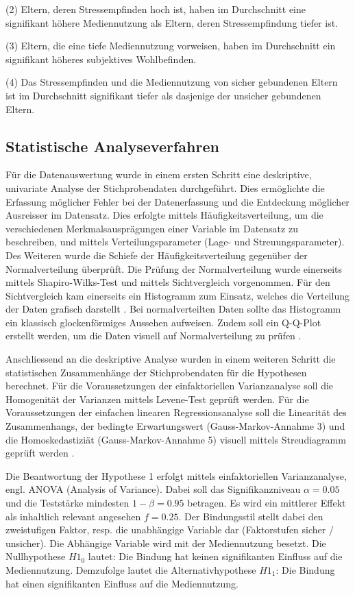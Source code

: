 (2) Eltern, deren Stressempfinden hoch ist, haben im Durchschnitt eine signifikant höhere Mediennutzung als Eltern, deren Stressempfindung tiefer ist.

(3) Eltern, die eine tiefe Mediennutzung vorweisen, haben im Durchschnitt ein signifikant höheres subjektives Wohlbefinden.

(4) Das Stressempfinden und die Mediennutzung von sicher gebundenen Eltern ist im Durchschnitt signifikant tiefer als dasjenige der unsicher gebundenen Eltern.


\subsection{Statistische Analyseverfahren}
Für die Datenauswertung wurde in einem ersten Schritt eine deskriptive, univariate Analyse der Stichprobendaten durchgeführt. Dies ermöglichte die Erfassung möglicher Fehler bei der Datenerfassung und die Entdeckung möglicher Ausreisser im Datensatz. Dies erfolgte mittels Häufigkeitsverteilung, um die verschiedenen Merkmalsausprägungen einer Variable im Datensatz zu beschreiben, und mittels Verteilungsparameter (Lage- und Streuungsparameter). Des Weiteren wurde die Schiefe der Häufigkeitsverteilung gegenüber der Normalverteilung überprüft. Die Prüfung der Normalverteilung wurde einerseits mittels Shapiro-Wilks-Test \cite{Shapiro1965} und mittels Sichtvergleich vorgenommen. Für den Sichtvergleich kam einerseits ein Histogramm zum Einsatz, welches die Verteilung der Daten grafisch darstellt \cite{Hemmerich2018}. Bei normalverteilten Daten sollte das Histogramm ein klassisch glockenförmiges Aussehen aufweisen. Zudem soll ein Q-Q-Plot erstellt werden, um die Daten visuell auf Normalverteilung zu prüfen \cite{Hemmerich2018}. 

Anschliessend an die deskriptive Analyse wurden in einem weiteren Schritt die statistischen Zusammenhänge der Stichprobendaten für die Hypothesen berechnet. Für die Voraussetzungen der einfaktoriellen Varianzanalyse soll die Homogenität der Varianzen mittels Levene-Test geprüft werden. Für die Voraussetzungen der einfachen linearen Regressionsanalyse soll die Linearität des Zusammenhangs, der bedingte Erwartungswert (Gauss-Markov-Annahme 3) und die Homoskedastiziät (Gauss-Markov-Annahme 5) visuell mittels Streudiagramm geprüft werden \cite{UniversitatZurich2018}.

Die Beantwortung der Hypothese 1 erfolgt mittels einfaktoriellen Varianzanalyse, engl. ANOVA (Analysis of Variance). Dabei soll das Signifikanzniveau $\alpha=0.05$ und die Teststärke mindesten $1-\beta=0.95$ betragen. Es wird ein mittlerer Effekt \cite{Cohen1988a} als inhaltlich relevant angesehen $f = 0.25$. Der Bindungsstil stellt dabei den zweistufigen Faktor, resp. die unabhängige Variable dar (Faktorstufen sicher / unsicher). Die Abhängige Variable wird mit der Mediennutzung besetzt. Die Nullhypothese $H1_{0}$ lautet: Die Bindung hat keinen signifikanten Einfluss auf die Mediennutzung. Demzufolge lautet die Alternativhypothese $H1_{1}$: Die Bindung hat einen signifikanten Einfluss auf die Mediennutzung.

